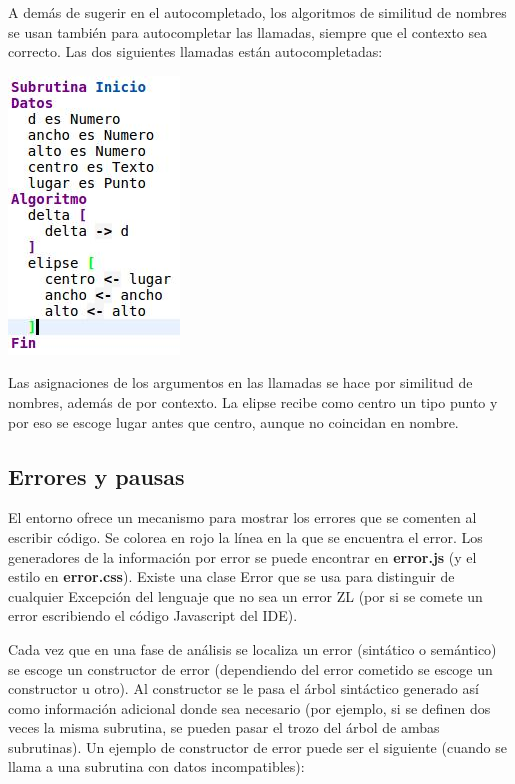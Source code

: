 \documentclass{report}
\begin{document}
	A demás de sugerir en el autocompletado, los algoritmos de similitud de nombres se usan también para autocompletar las llamadas, siempre que el contexto sea correcto. Las dos siguientes llamadas están autocompletadas:
	
	\begin{center}
	\includegraphics{autocompletado}
	
	Las asignaciones de los argumentos en las llamadas se hace por similitud de nombres, además de por contexto. La elipse recibe como centro un tipo punto y por eso se escoge lugar antes que centro, aunque no coincidan en nombre.
	\end{center}

	
	\subsection{Errores y pausas}
	
	El entorno ofrece un mecanismo para mostrar los errores que se comenten al escribir código. Se colorea en rojo la línea en la que se encuentra el error. Los generadores de la información por error se puede encontrar en \textbf{error.js} (y el estilo en \textbf{error.css}). Existe una clase Error que se usa para distinguir de cualquier Excepción del lenguaje que no sea un error ZL (por si se comete un error escribiendo el código Javascript del IDE).
	
	\vspace{10px}
	
	Cada vez que en una fase de análisis se localiza un error (sintático o semántico) se escoge un constructor de error (dependiendo del error cometido se escoge un constructor u otro). Al constructor se le pasa el árbol sintáctico generado así como información adicional donde sea necesario (por ejemplo, si se definen dos veces la misma subrutina, se pueden pasar el trozo del árbol de ambas subrutinas). Un ejemplo de constructor de error puede ser el siguiente (cuando se llama a una subrutina con datos incompatibles):
	
\end{document}
